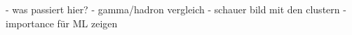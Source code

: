 \begin{frame}
    - was passiert hier?
    - gamma/hadron vergleich
    - schauer bild mit den clustern
    - importance für ML zeigen
\end{frame}